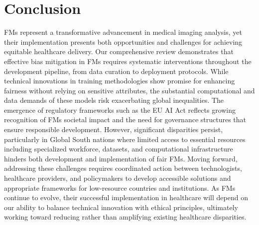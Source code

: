 \section{Conclusion}

FMs represent a transformative advancement in medical imaging analysis, yet their implementation presents both opportunities and challenges for achieving equitable healthcare delivery. Our comprehensive review demonstrates that effective bias mitigation in FMs requires systematic interventions throughout the development pipeline, from data curation to deployment protocols. While technical innovations in training methodologies show promise for enhancing fairness without relying on sensitive attributes, the substantial computational and data demands of these models risk exacerbating global inequalities. The emergence of regulatory frameworks such as the EU AI Act reflects growing recognition of FMs societal impact and the need for governance structures that ensure responsible development. However, significant disparities persist, particularly in Global South nations where limited access to essential resources including specialized workforce, datasets, and computational infrastructure hinders both development and implementation of fair FMs. Moving forward, addressing these challenges requires coordinated action between technologists, healthcare providers, and policymakers to develop accessible solutions and appropriate frameworks for low-resource countries and institutions. As FMs continue to evolve, their successful implementation in healthcare will depend on our ability to balance technical innovation with ethical principles, ultimately working toward reducing rather than amplifying existing healthcare disparities.